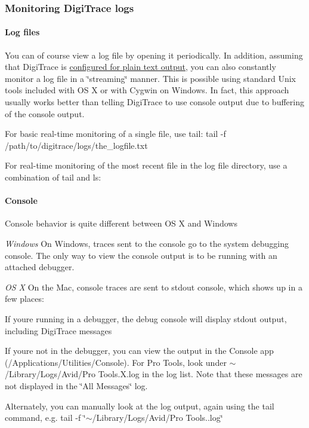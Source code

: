 \hypertarget{a00364_digitrace__logfiles__monitoring}{}\subsubsection{Monitoring Digi\+Trace logs}\label{a00364_digitrace__logfiles__monitoring}
\hypertarget{a00364_digitrace__logfiles__monitoring__files}{}\paragraph{Log files}\label{a00364_digitrace__logfiles__monitoring__files}
 You can of course view a log file by opening it periodically. In addition, assuming that Digi\+Trace is \hyperlink{a00364_digitrace__gettingstarted__configurefordevelopment}{configured for plain text output}, you can also constantly monitor a log file in a \char`\"{}streaming\char`\"{} manner. This is possible using standard Unix tools included with O\+S X or with Cygwin on Windows. In fact, this approach usually works better than telling Digi\+Trace to use console output due to buffering of the console output.

 
\begin{DoxyItemize}
\item For basic real-\/time monitoring of a single file, use {\ttfamily tail}\+: {\ttfamily tail -\/f /path/to/digitrace/logs/the\+\_\+logfile.txt }  
\item For real-\/time monitoring of the most recent file in the log file directory, use a combination of {\ttfamily tail} and {\ttfamily ls}\+:   
\end{DoxyItemize}

\hypertarget{a00364_digitrace__logfiles__monitoring__console}{}\paragraph{Console}\label{a00364_digitrace__logfiles__monitoring__console}
 Console behavior is quite different between O\+S X and Windows

 {\itshape Windows } On Windows, traces sent to the console go to the system debugging console. The only way to view the console output is to be running with an attached debugger. 

 {\itshape O\+S X } On the Mac, console traces are sent to stdout console, which shows up in a few places\+: 
\begin{DoxyItemize}
\item If you\textquotesingle{}re running in a debugger, the debug console will display stdout output, including Digi\+Trace messages  
\item If you\textquotesingle{}re not in the debugger, you can view the output in the Console app (/\+Applications/\+Utilities/\+Console). For Pro Tools, look under $\sim$/\+Library/\+Logs/\+Avid/\+Pro Tools.\+X.\+log in the log list. Note that these messages are not displayed in the \char`\"{}\+All Messages\char`\"{} log.  
\item Alternately, you can manually look at the log output, again using the {\ttfamily tail} command, e.\+g. {\ttfamily tail -\/f \char`\"{}$\sim$/\+Library/\+Logs/\+Avid/\+Pro Tools..\+log\char`\"{}}  
\end{DoxyItemize}

